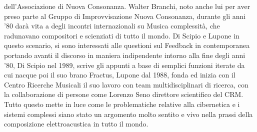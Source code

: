dell'Associazione di Nuova Consonanza.
Walter Branchi, noto anche lui
per aver preso parte al Gruppo di Improvvisazione Nuova Consonanza,
durante gli anni '80 darà vita a degli incontri internazionali su
Musica complessità, che radunavano compositori e scienziati di
tutto il mondo.
Di Scipio e Lupone in questo scenario, si sono interessati alle questioni
sul Feedback in contemporanea
portando avanti il discorso in maniera indipendente intorno alla fine degli anni '80,
Di Scipio nel 1989, scrive gli appunti a base di semplici funzioni
iterate da cui nacque poi il suo brano Fractus,
Lupone dal 1988, fonda ed inizia con il Centro Ricerche Musicali il suo lavoro
con team multidisciplinari di ricerca,
con la collaborazione di persone come Lorenzo Seno direttore scientifico del CRM.
Tutto questo mette in luce come le problematiche relative alla cibernetica
e i sistemi complessi siano stato un argomento molto sentito e vivo
nella prassi della composizione elettroacustica in tutto il mondo.

